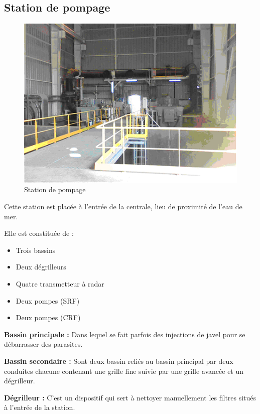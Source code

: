 \subsection{Station de pompage}
\begin{figure}[h]
\centering
\includegraphics[scale=0.7]{./Figures/stationpompage.png}
\caption{Station de pompage}
\end{figure}
Cette station est placée à l'entrée de la centrale, lieu de proximité de l'eau de mer.


Elle est constituée de : 

\begin{itemize}
\item Trois bassins
\item Deux dégrilleurs 
\item Quatre transmetteur à radar
\item Deux pompes (SRF)
\item Deux  pompes (CRF)

\end{itemize}

\textbf{Bassin principale : }Dans lequel se fait parfois des injections de javel pour se débarrasser des parasites.

\textbf{Bassin secondaire : }Sont deux bassin reliés au bassin principal par deux conduites chacune contenant une grille fine suivie par une grille avancée et un dégrilleur.

\textbf{Dégrilleur : } C'est un dispositif qui sert à nettoyer  manuellement les filtres situés à l'entrée de la station.                                                                                                          

